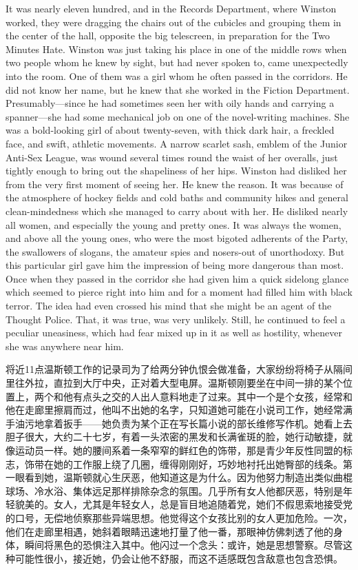 \begin{paracol}{2}
It was nearly eleven hundred, and in the Records Department, where
Winston worked, they were dragging the chairs out of the cubicles and
grouping them in the center of the hall, opposite the big telescreen, in
preparation for the Two Minutes Hate. Winston was just taking his place
in one of the middle rows when two people whom he knew by sight, but had
never spoken to, came unexpectedly into the room. One of them was a girl
whom he often passed in the corridors. He did not know her name, but he
knew that she worked in the Fiction Department. Presumably---since he
had sometimes seen her with oily hands and carrying a spanner---she had
some mechanical job on one of the novel-writing machines. She was a
bold-looking girl of about twenty-seven, with thick dark hair, a
freckled face, and swift, athletic movements. A narrow scarlet sash,
emblem of the Junior Anti-Sex League, was wound several times round the
waist of her overalls, just tightly enough to bring out the shapeliness
of her hips. Winston had disliked her from the very first moment of
seeing her. He knew the reason. It was because of the atmosphere of
hockey fields and cold baths and community hikes and general
clean-mindedness which she managed to carry about with her. He disliked
nearly all women, and especially the young and pretty ones. It was
always the women, and above all the young ones, who were the most
bigoted adherents of the Party, the swallowers of slogans, the amateur
spies and nosers-out of unorthodoxy. But this particular girl gave him
the impression of being more dangerous than most. Once when they passed
in the corridor she had given him a quick sidelong glance which seemed
to pierce right into him and for a moment had filled him with black
terror. The idea had even crossed his mind that she might be an agent of
the Thought Police. That, it was true, was very unlikely. Still, he
continued to feel a peculiar uneasiness, which had fear mixed up in it
as well as hostility, whenever she was anywhere near him.

\switchcolumn

将近11点温斯顿工作的记录司为了给两分钟仇恨会做准备，大家纷纷将椅子从隔间里往外拉，直拉到大厅中央，正对着大型电屏。温斯顿刚要坐在中间一排的某个位置上，两个和他有点头之交的人出人意料地走了过来。其中一个是个女孩，经常和他在走廊里擦肩而过，他叫不出她的名字，只知道她可能在小说司工作，她经常满手油污地拿着扳手——她负责为某个正在写长篇小说的部长维修写作机。她看上去胆子很大，大约二十七岁，有着一头浓密的黑发和长满雀斑的脸，她行动敏捷，就像运动员一样。她的腰间系着一条窄窄的鲜红色的饰带，那是青少年反性同盟的标志，饰带在她的工作服上绕了几圈，缠得刚刚好，巧妙地衬托出她臀部的线条。第一眼看到她，温斯顿就心生厌恶，他知道这是为什么。因为他努力制造出类似曲棍球场、冷水浴、集体远足那样排除杂念的氛围。几乎所有女人他都厌恶，特别是年轻貌美的。女人，尤其是年轻女人，总是盲目地追随着党，她们不假思索地接受党的口号，无偿地侦察那些异端思想。他觉得这个女孩比别的女人更加危险。一次，他们在走廊里相遇，她斜着眼睛迅速地打量了他一番，那眼神仿佛刺透了他的身体，瞬间将黑色的恐惧注入其中。他闪过一个念头：或许，她是思想警察。尽管这种可能性很小，接近她，仍会让他不舒服，而这不适感既包含敌意也包含恐惧。


\end{paracol}
